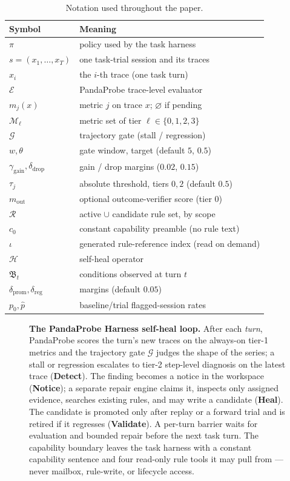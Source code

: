 \documentclass[11pt,letterpaper]{article}
\newcommand{\Rset}{\mathcal{R}}
\newcommand{\evalfn}{\mathcal{E}}
\newcommand{\Heal}{\mathcal{H}}
\newcommand{\Breach}{\mathfrak{B}}
\newcommand{\dpromote}{\delta_{\mathrm{prom}}}
\newcommand{\dregress}{\delta_{\mathrm{reg}}}
\newcommand{\Mset}{\mathcal{M}}
\newcommand{\Gate}{\mathcal{G}}
\newcommand{\gwin}{w}
\newcommand{\gtarget}{\theta}
\newcommand{\ggain}{\gamma_{\mathrm{gain}}}
\newcommand{\gdrop}{\delta_{\mathrm{drop}}}
\newcommand{\outcome}{m_{\mathrm{out}}}
\newcommand{\idx}{\iota}
\begin{document}
\begin{table}[H]
\centering
\caption{Notation used throughout the paper.}
\label{tab:notation}
\begin{tabularx}{0.85\textwidth}{@{}lX@{}}
\toprule
Symbol & Meaning \\
\midrule
$\pi$ & policy used by the task harness \\
$s=(x_1,\ldots,x_T)$ & one task-trial session and its traces \\
$x_i$ & the $i$-th trace (one task turn) \\
$\evalfn$ & PandaProbe trace-level evaluator \\
$m_j(x)$ & metric $j$ on trace $x$; $\varnothing$ if pending \\
$\Mset_\ell$ & metric set of tier $\ell\in\{0,1,2,3\}$ \\
$\Gate$ & trajectory gate (stall / regression) \\
$\gwin,\gtarget$ & gate window, target (default $5$, $0.5$) \\
$\ggain,\gdrop$ & gain / drop margins ($0.02$, $0.15$) \\
$\tau_j$ & absolute threshold, tiers $0,2$ (default $0.5$) \\
$\outcome$ & optional outcome-verifier score (tier $0$) \\
$\Rset$ & active $\cup$ candidate rule set, by scope \\
$c_0$ & constant capability preamble (no rule text) \\
$\idx$ & generated rule-reference index (read on demand) \\
$\Heal$ & self-heal operator \\
$\Breach_t$ & conditions observed at turn $t$ \\
$\dpromote,\dregress$ & margins (default $0.05$) \\
$p_0,\hat p$ & baseline/trial flagged-session rates \\
\bottomrule
\end{tabularx}
\end{table}

\begin{figure}[H]
\centering
\resizebox{\textwidth}{!}{}
\caption{\textbf{The PandaProbe Harness self-heal loop.} After each \emph{turn}, PandaProbe scores
the turn's new traces on the always-on tier-1 metrics and the trajectory gate $\Gate$ judges the
shape of the series; a stall or regression escalates to tier-2 step-level diagnosis on the latest
trace (\textbf{Detect}). The finding becomes a notice in the workspace (\textbf{Notice}); a
separate repair engine claims it, inspects only assigned evidence, searches existing
rules, and may write a candidate (\textbf{Heal}). The candidate is promoted only after replay or a
forward trial and is retired if it regresses (\textbf{Validate}). A per-turn barrier waits for
evaluation and bounded repair before the next task turn. The capability boundary leaves the
task harness with a constant capability sentence and four read-only rule tools it may pull from --- never
mailbox, rule-write, or lifecycle access.}
\label{fig:overview}
\end{figure}
\end{document}
